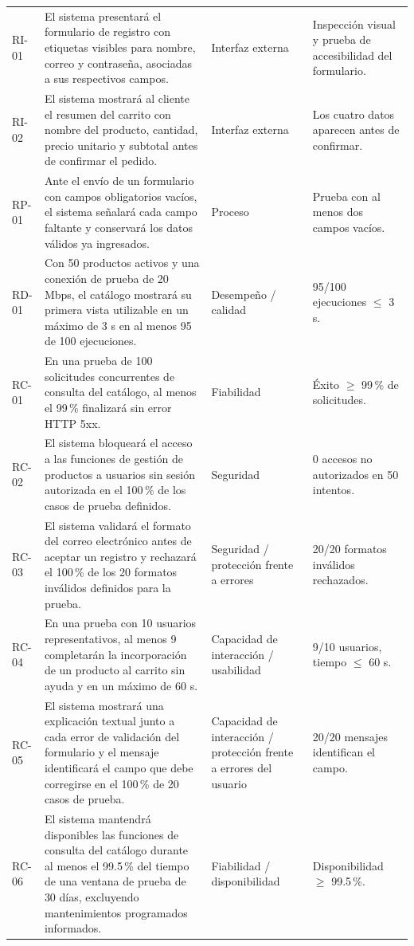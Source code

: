 \documentclass[11pt,a4paper]{article}
\begin{document}
\begin{longtable}{@{}L{0.08\textwidth} L{0.42\textwidth} L{0.15\textwidth} L{0.21\textwidth}@{}}
RI-01 & El sistema presentará el formulario de registro con etiquetas visibles para nombre, correo y contraseña, asociadas a sus respectivos campos. & Interfaz externa & Inspección visual y prueba de accesibilidad del formulario. \\
RI-02 & El sistema mostrará al cliente el resumen del carrito con nombre del producto, cantidad, precio unitario y subtotal antes de confirmar el pedido. & Interfaz externa & Los cuatro datos aparecen antes de confirmar. \\
RP-01 & Ante el envío de un formulario con campos obligatorios vacíos, el sistema señalará cada campo faltante y conservará los datos válidos ya ingresados. & Proceso & Prueba con al menos dos campos vacíos. \\
RD-01 & Con 50 productos activos y una conexión de prueba de 20 Mbps, el catálogo mostrará su primera vista utilizable en un máximo de 3 s en al menos 95 de 100 ejecuciones. & Desempeño / calidad & 95/100 ejecuciones $\leq$ 3 s. \\
RC-01 & En una prueba de 100 solicitudes concurrentes de consulta del catálogo, al menos el 99\,\% finalizará sin error HTTP 5xx. & Fiabilidad & Éxito $\geq$ 99\,\% de solicitudes. \\
RC-02 & El sistema bloqueará el acceso a las funciones de gestión de productos a usuarios sin sesión autorizada en el 100\,\% de los casos de prueba definidos. & Seguridad & 0 accesos no autorizados en 50 intentos. \\
RC-03 & El sistema validará el formato del correo electrónico antes de aceptar un registro y rechazará el 100\,\% de los 20 formatos inválidos definidos para la prueba. & Seguridad / protección frente a errores & 20/20 formatos inválidos rechazados. \\
RC-04 & En una prueba con 10 usuarios representativos, al menos 9 completarán la incorporación de un producto al carrito sin ayuda y en un máximo de 60 s. & Capacidad de interacción / usabilidad & 9/10 usuarios, tiempo $\leq$ 60 s. \\
RC-05 & El sistema mostrará una explicación textual junto a cada error de validación del formulario y el mensaje identificará el campo que debe corregirse en el 100\,\% de 20 casos de prueba. & Capacidad de interacción / protección frente a errores del usuario & 20/20 mensajes identifican el campo. \\
RC-06 & El sistema mantendrá disponibles las funciones de consulta del catálogo durante al menos el 99.5\,\% del tiempo de una ventana de prueba de 30 días, excluyendo mantenimientos programados informados. & Fiabilidad / disponibilidad & Disponibilidad $\geq$ 99.5\,\%. \\
\bottomrule
\end{longtable}
\end{document}
